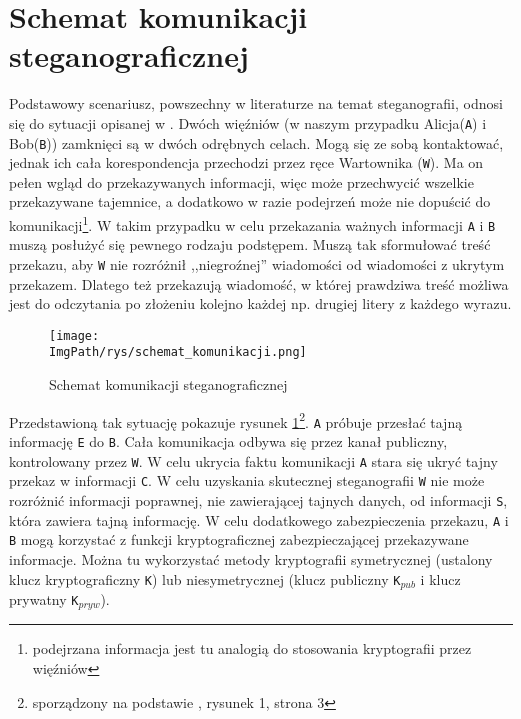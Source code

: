 \documentclass[a4paper,12pt,twoside,openany]{report}
\newcommand{\ImgPath}{.}
\newcommand{\tech}{\texttt}
\begin{document}
\section{Schemat komunikacji steganograficznej}
\label{sectionSchematKomunikacjiSteganograficznej}
Podstawowy scenariusz, powszechny w literaturze na temat steganografii, odnosi 
się do sytuacji opisanej w \cite{PrisonersProblem}. Dwóch więźniów (w naszym 
przypadku Alicja(\tech{A}) i Bob(\tech{B})) zamknięci są w dwóch odrębnych 
celach. Mogą się ze sobą kontaktować, jednak ich cała korespondencja przechodzi 
przez ręce Wartownika (\tech{W}). Ma on pełen wgląd do przekazywanych 
informacji, więc może przechwycić wszelkie przekazywane tajemnice, a dodatkowo w 
razie podejrzeń może nie dopuścić do komunikacji\footnote{podejrzana informacja 
jest tu analogią do stosowania kryptografii przez więźniów}. W takim przypadku w 
celu przekazania ważnych informacji \tech{A} i \tech{B} muszą posłużyć się 
pewnego rodzaju podstępem. Muszą tak sformułować treść przekazu, aby \tech{W} 
nie rozróżnił ,,niegroźnej'' wiadomości od wiadomości z ukrytym przekazem. 
Dlatego też przekazują wiadomość, w której prawdziwa treść możliwa jest do 
odczytania po złożeniu kolejno każdej np.  drugiej litery z każdego wyrazu.
\begin{figure}[!htbp]
	\begin{center}
\centering
\texttt{[image: \\ImgPath/rys/schemat\_komunikacji.png]}
\end{center}
	\caption{Schemat komunikacji steganograficznej}
	\label{schematKomunikacji}
\end{figure}

Przedstawioną tak sytuację pokazuje rysunek 
\ref{schematKomunikacji}\footnote{sporządzony na podstawie 
\cite{schematKomunikacjiPrzypis}, rysunek 1, strona 3}. \tech{A} próbuje 
przesłać tajną informację \tech{E} do \tech{B}. Cała komunikacja odbywa się 
przez kanał publiczny, kontrolowany przez \tech{W}. W celu ukrycia faktu 
komunikacji \tech{A} stara się ukryć tajny przekaz w informacji \tech{C}. W celu 
uzyskania skutecznej steganografii \tech{W} nie może rozróżnić informacji 
poprawnej, nie zawierającej tajnych danych, od informacji \tech{S}, która 
zawiera tajną informację. W celu dodatkowego zabezpieczenia przekazu, \tech{A} i 
\tech{B} mogą korzystać z funkcji kryptograficznej zabezpieczającej przekazywane 
informacje. Można tu wykorzystać metody kryptografii symetrycznej (ustalony 
klucz kryptograficzny \tech{K}) lub niesymetrycznej (klucz publiczny 
\tech{K}$_{pub}$ i klucz prywatny \tech{K}$_{pryw}$).
\end{document}
